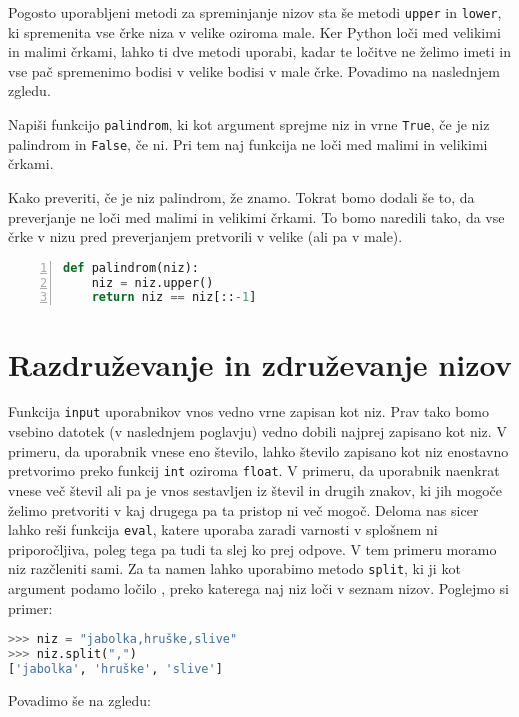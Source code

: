 Pogosto uporabljeni metodi za spreminjanje nizov sta še metodi \texttt{upper} in \texttt{lower}, ki spremenita vse črke niza v velike oziroma male. Ker Python loči med velikimi in malimi črkami, lahko ti dve metodi uporabi, kadar te ločitve ne želimo imeti in vse pač spremenimo bodisi v velike bodisi v male črke. Povadimo na naslednjem zgledu.

\begin{zgled}
Napiši funkcijo \texttt{palindrom}, ki kot argument sprejme niz in vrne \texttt{True}, če je niz palindrom in \texttt{False}, če ni. Pri tem naj funkcija ne loči med malimi in velikimi črkami.
\end{zgled}

\begin{resitev}
Kako preveriti, če je niz palindrom, že znamo. Tokrat bomo dodali še to, da preverjanje ne loči med malimi in velikimi črkami. To bomo naredili tako, da vse črke v nizu pred preverjanjem pretvorili v velike (ali pa v male).
\begin{lstlisting}[language=Python, showstringspaces=false,numbers=left]
def palindrom(niz):
    niz = niz.upper()
    return niz == niz[::-1]
\end{lstlisting}
\end{resitev}

\section{Razdruževanje in združevanje nizov}
Funkcija \texttt{input} uporabnikov vnos vedno vrne zapisan kot niz. Prav tako bomo vsebino datotek (v naslednjem poglavju) vedno dobili najprej zapisano kot niz. V primeru, da uporabnik vnese eno število, lahko število zapisano kot niz enostavno pretvorimo preko funkcij \texttt{int} oziroma \texttt{float}. V primeru, da uporabnik naenkrat vnese več števil ali pa je vnos sestavljen iz števil in drugih znakov, ki jih mogoče želimo pretvoriti v kaj drugega pa ta pristop ni več mogoč. Deloma nas sicer lahko reši funkcija \texttt{eval}, katere uporaba zaradi varnosti v splošnem ni priporočljiva, poleg tega pa tudi ta slej ko prej odpove. V tem primeru moramo niz razčleniti  sami. Za ta namen lahko uporabimo metodo \texttt{split}, ki ji kot argument podamo ločilo , preko katerega naj niz loči v seznam nizov. Poglejmo si primer:
\begin{lstlisting}[language=Python, showstringspaces=false]
>>> niz = "jabolka,hruške,slive"
>>> niz.split(",")
['jabolka', 'hruške', 'slive']
\end{lstlisting}
Povadimo še na zgledu:

